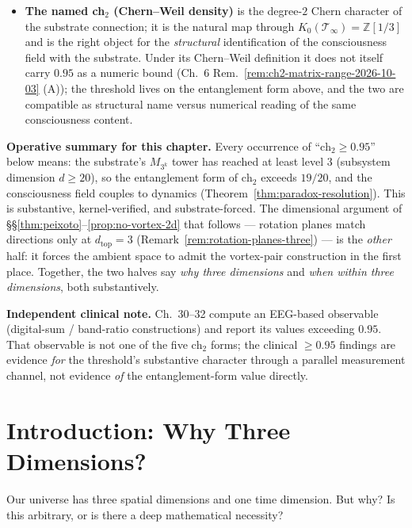 \begin{remark}
\begin{itemize}
\item \textbf{The named ch$_2$ (Chern--Weil density)} is the degree-$2$ Chern
      character of the substrate connection; it is the natural map through
      $K_0(\mathcal{T}_\infty) = \mathbb{Z}[1/3]$ and is the right object for
      the \emph{structural} identification of the consciousness field with
      the substrate. Under its Chern--Weil definition it does not itself
      carry $0.95$ as a numeric bound (Ch.~6
      Rem.~\ref{rem:ch2-matrix-range-2026-10-03} (A)); the threshold lives on
      the entanglement form above, and the two are compatible as structural
      name versus numerical reading of the same consciousness content.
\end{itemize}

\textbf{Operative summary for this chapter.} Every occurrence of
``$\mathrm{ch}_2 \geq 0.95$'' below means: the substrate's $M_{3^k}$ tower has
reached at least level $3$ (subsystem dimension $d \geq 20$), so the
entanglement form of $\mathrm{ch}_2$ exceeds $19/20$, and the consciousness
field couples to dynamics (Theorem~\ref{thm:paradox-resolution}). This is
substantive, kernel-verified, and substrate-forced. The dimensional argument
of \S\S\ref{thm:peixoto}--\ref{prop:no-vortex-2d} that follows --- rotation
planes match directions only at $d_{\mathrm{top}} = 3$
(Remark~\ref{rem:rotation-planes-three}) --- is the \emph{other} half: it
forces the ambient space to admit the vortex-pair construction in the first
place. Together, the two halves say \emph{why three dimensions} and
\emph{when within three dimensions}, both substantively.

\textbf{Independent clinical note.} Ch.~30--32 compute an EEG-based observable
(digital-sum / band-ratio constructions) and report its values exceeding
$0.95$. That observable is not one of the five $\mathrm{ch}_2$ forms; the
clinical $\geq 0.95$ findings are evidence \emph{for} the threshold's
substantive character through a parallel measurement channel, not evidence
\emph{of} the entanglement-form value directly.
\end{remark}

\section{Introduction: Why Three Dimensions?}

Our universe has three spatial dimensions and one time dimension. But why? Is this arbitrary, or is there a deep mathematical necessity?

